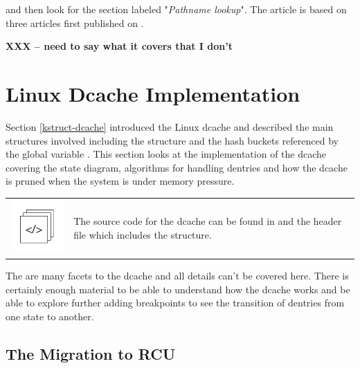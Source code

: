 \noindent
and then look for the section labeled "\textit{Pathname lookup}". The article is based on three articles first published on . 

\textbf{XXX -- need to say what it covers that I don't}


\section{Linux Dcache Implementation}\label{vfs-dcache}

Section \ref{kstruct-dcache} introduced the Linux dcache and described the main structures involved including the  structure and the hash buckets referenced by the global variable . This section looks at the implementation of the dcache covering the  state diagram, algorithms for handling dentries and how the dcache is pruned when the system is under memory pressure.

\begin{table}[h]
\begin{tabular}{ll}
\parbox[l]{0.6in}{\includegraphics[scale=0.8]{figures/src-xref.pdf}} & \parbox[l]{4in}{\small{The source code for the dcache can be found in  and the header file  which includes the  structure.}}
\end{tabular}
\end{table}

\noindent
The are many facets to the dcache and all details can't be covered here. There is certainly enough material to be able to understand how the dcache works and be able to explore further adding  breakpoints to see the transition of dentries from one state to another.


\subsection{The Migration to RCU}

